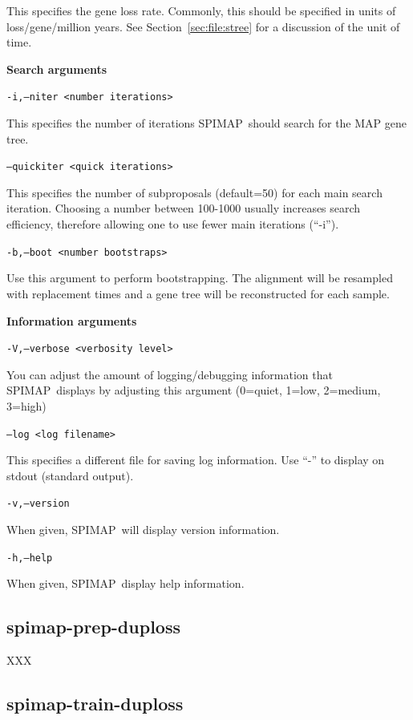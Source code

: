 \documentclass[11pt]{article}
\newcommand{\secref}[1]{Section~\ref{#1}}
\newcommand{\spimap}{{\sf\scshape SPIMAP}}
\begin{document}
This specifies the gene loss rate.  Commonly, this should be 
specified in units of loss/gene/million years.  See 
\secref{sec:file:stree} for a discussion of the unit of time.


{\bf Search arguments}

{\tt -i,--niter  <number iterations>}

This specifies the number of iterations \spimap\ should search for the 
MAP gene tree.

{\tt --quickiter  <quick iterations>}

This specifies the number of subproposals (default=50) for each main 
search iteration.  Choosing a number between 100-1000 usually increases
search efficiency, therefore allowing one to use fewer main iterations 
(``-i'').

{\tt -b,--boot  <number bootstraps>}

Use this argument to perform bootstrapping.  The alignment will be resampled
with replacement {\tt <number bootstrap>} times and a gene tree will be 
reconstructed for each sample.

{\bf Information arguments}

{\tt -V,--verbose  <verbosity level>}

You can adjust the amount of logging/debugging information that \spimap\ 
displays by adjusting this argument (0=quiet, 1=low, 2=medium, 3=high)


{\tt --log  <log filename>}

This specifies a different file for saving log information.
Use ``-'' to display on stdout (standard output).

{\tt -v,--version}

When given, \spimap\ will display version information.

{\tt -h,--help}

When given, \spimap\ display help information.


\subsection{spimap-prep-duploss}
\label{sec:prog:spimap-prep-duploss}

XXX

\subsection{spimap-train-duploss}
\label{sec:prog:spimap-train-duploss}
\end{document}
